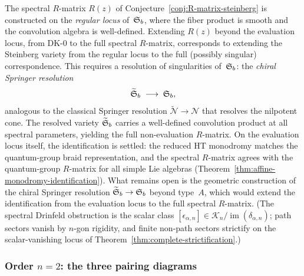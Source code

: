 \begin{remark}
\label{rem:springer-resolution-chiral}
The spectral $R$-matrix $R(z)$ of
Conjecture~\ref{conj:R-matrix-steinberg} is constructed on the
\emph{regular locus} of~$\mathfrak{S}_b$, where the fiber product
is smooth and the convolution algebra is well-defined. Extending
$R(z)$ beyond the evaluation locus, from DK-$0$ to the full
spectral $R$-matrix, corresponds to extending the Steinberg
variety from the regular locus to the full (possibly singular)
correspondence. This requires a resolution of singularities
of~$\mathfrak{S}_b$: the \emph{chiral Springer resolution}
\[
\widetilde{\mathfrak{S}}_b \;\longrightarrow\; \mathfrak{S}_b,
\]
analogous to the classical Springer resolution
$\widetilde{\mathcal{N}} \to \mathcal{N}$ that resolves the
nilpotent cone. The resolved variety
$\widetilde{\mathfrak{S}}_b$ carries a well-defined convolution
product at all spectral parameters, yielding the full
non-evaluation $R$-matrix. On the evaluation locus itself, the
identification is settled: the reduced HT monodromy matches the
quantum-group braid representation, and the spectral $R$-matrix
agrees with the quantum-group $R$-matrix for all simple Lie
algebras \textup{(}Theorem~\textup{\ref{thm:affine-monodromy-identification}}\textup{)}.
What remains open is the geometric construction of the chiral
Springer resolution $\widetilde{\mathfrak{S}}_b \to \mathfrak{S}_b$
beyond type~$A$, which would extend the identification from the
evaluation locus to the full spectral $R$-matrix.
(The spectral Drinfeld obstruction is the scalar class
$[\epsilon_{\alpha,n}]\in
\mathscr K_n/\operatorname{im}(\delta_{\alpha,n})$; path sectors
vanish by $n$-gon rigidity, and finite non-path sectors strictify on
the scalar-vanishing locus of
Theorem~\ref{thm:complete-strictification}.)
\end{remark}

\subsubsection{Order $n = 2$: the three pairing diagrams}

